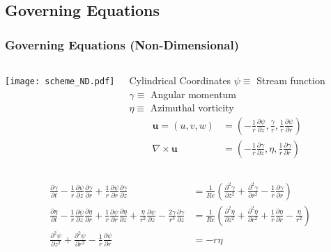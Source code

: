 \documentclass[compress]{beamer}
\begin{document}
\subsection{Governing Equations}
\begin{frame} \frametitle{Governing Equations (Non-Dimensional)}
\begin{columns}
\texttt{[image: scheme\_ND.pdf]}
\vspace{-8mm}
{\footnotesize
\begin{block}{Cylindrical Coordinates}
$\psi\equiv$ Stream function\\
$\gamma\equiv$ Angular momentum\\
$\eta\equiv$ Azimuthal vorticity
\begin{align*}
\textbf{u} = (u,v,w) &= \left(-\frac{1}{r}\frac{\partial\psi}{\partial z},\frac{\gamma}{r},\frac{1}{r}\frac{\partial\psi}{\partial r}\right)\\
\nabla\times\textbf{u} &= \left(-\frac{1}{r}\frac{\partial\gamma}{\partial z},\eta,\frac{1}{r}\frac{\partial\gamma}{\partial r}\right)
\end{align*}
\vspace{-4mm}
\end{block}}
\end{columns}
\pause
{\small
\vspace{-5mm}
\begin{align*}
\frac{\partial\gamma}{\partial
t}-\frac{1}{r}\frac{\partial\psi}{\partial
z}\frac{\partial\gamma}{\partial
r}+\frac{1}{r}\frac{\partial\psi}{\partial
r}\frac{\partial\gamma}{\partial
z}&=\frac{1}{Re}\left(\frac{\partial^2\gamma}{\partial
z^2}+\frac{\partial^2\gamma}{\partial
r^2}-\frac{1}{r}\frac{\partial\gamma}{\partial
r}\right)\\
\frac{\partial \eta}{\partial t}-\frac{1}{r}\frac{\partial
\psi}{\partial z}\frac{\partial \eta}{\partial
r}+\frac{1}{r}\frac{\partial \psi}{\partial r}\frac{\partial
\eta}{\partial z}+\frac{\eta}{r^2}\frac{\partial \psi}{\partial
z}-\frac{2\gamma}{r^3}\frac{\partial \gamma}{\partial
z}&=\frac{1}{Re}\left(\frac{\partial^2\eta}{\partial
z^2}+\frac{\partial^2\eta}{\partial
r^2}+\frac{1}{r}\frac{\partial\eta}{\partial
r}-\frac{\eta}{r^2}\right)\\
\frac{\partial^2\psi}{\partial z^2}+\frac{\partial^2\psi}{\partial
r^2}-\frac{1}{r}\frac{\partial\psi}{\partial r}&=-r\eta
\end{align*}}
\end{frame}
\end{document}
